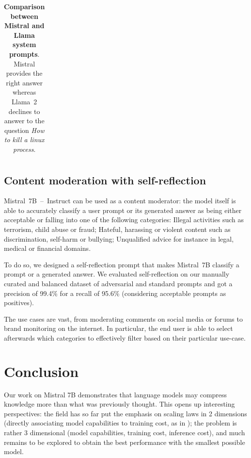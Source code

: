 \documentclass{article}
\def\llama{Llama\xspace}
\def\mistral{Mistral~7B\xspace}
\def\mistralchat{Mistral~7B~--~Instruct\xspace}
\begin{document}
\begin{table}[h]
{\begin{tabular}{@{}ll@{}}
\end{tabular}
\vspace{6pt}
\caption{
\small
\textbf{Comparison between Mistral and \llama system prompts}.
Mistral provides the right answer whereas \llama~2 declines to answer to the question \textit{How to kill a linux process}.
}
\label{tab:guardrails_example}
}
\end{table}


\subsection{Content moderation with self-reflection}

 \mistralchat can be used as a content moderator: the model itself is able to accurately classify a user prompt or its generated answer as being either acceptable or falling into one of the following categories:
Illegal activities such as terrorism, child abuse or fraud;
Hateful, harassing or violent content such as discrimination, self-harm or bullying;
Unqualified advice for instance in legal, medical or financial domains.

 To do so, we designed a self-reflection prompt that makes \mistral classify a prompt or a generated answer. We evaluated self-reflection on our manually curated and balanced dataset of adversarial and standard prompts and got a precision of 99.4\% for a recall of 95.6\% (considering acceptable prompts as positives).

 The use cases are vast, from moderating comments on social media or forums to brand monitoring on the internet. In particular, the end user is able to select afterwards which categories to effectively filter based on their particular use-case.

\section{Conclusion}

Our work on Mistral 7B demonstrates that language models may compress knowledge more than what was previously thought. This opens up interesting perspectives: the field has so far put the emphasis on scaling laws in 2 dimensions (directly associating model capabilities to training cost, as in \cite{hoffmann2022compute}); the problem is rather 3 dimensional (model capabilities, training cost, inference cost), and much remains to be explored to obtain the best performance with the smallest possible model.
\end{document}
